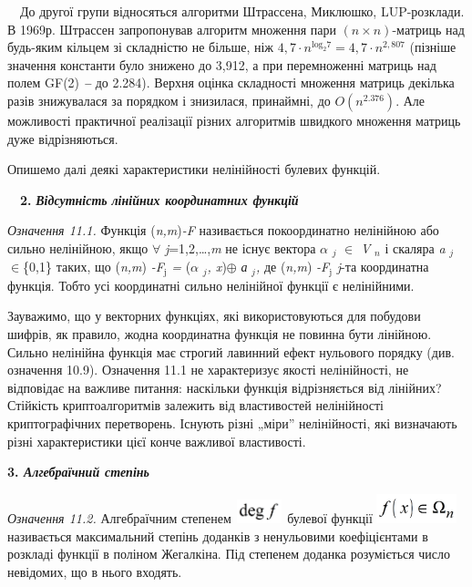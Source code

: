 \documentclass[a4paper]{article}
\newcommand\textsubscript[1]{\ensuremath{{}_{\text{#1}}}}
\newcounter{}
\begin{document}
\ \ До другої групи відносяться алгоритми Штрассена, Миклюшко, LUP-розклади. В
1969р. Штрассен запропонував алгоритм множення пари  ${(n\times n)}${}-матриць
над будь-яким кільцем зі складністю не більше, ніж  ${4,7\cdot
n^{{\text{log}_{{2}}7}}=4,7\cdot n^{2,\text{807}}}$ (пізніше значення константи
було знижено до 3,912, а при перемноженні матриць над полем
GF(2)\textbf{\textit{ – }}до  2.284). Верхня оцінка складності множення матриць
декілька разів знижувалася за порядком і  знизилася, принаймні, до 
${O(n^{{2\text{.}\text{376}}})}$. Але можливості практичної реалізації  різних
алгоритмів швидкого множення матриць дуже відрізняються. 

Опишемо далі деякі характеристики нелінійності булевих функцій.


\bigskip

\ \ \textbf{2. }\textbf{\textit{Відсутність}}\textbf{  }\textbf{\textit{лінійних
координатних функцій}}

 \textit{Означення 11.1.}\textit{ } Функція (\textit{n,m})\textit{{}-}\textit{F}
 називається покоординатно нелінійною або сильно нелінійною, якщо ${\forall}$
\textit{j}=1,2,…,\textit{m }не існує вектора ${\alpha}$ ${{}_{{j}}}$ ${\in}$
\textit{V} ${{}_{{n}}}$ і скаляра \textit{a} ${{}_{{j}}}$${\in}$\{0,1\} таких,
що (\textit{n,m})\textit{ -F{\textbar}}\textit{\textsubscript{j}}\textit{ =}
(\textit{${\alpha}$} ${{}_{{j}}}$\textit{, x})${\oplus}$\textit{ }\textit{а}
${{}_{{j}}}$\textit{, }де (\textit{n,m})\textit{
-F{\textbar}}\textit{\textsubscript{j}} \textit{ }\textit{j}{}-та координатна
функція. Тобто усі координатні сильно нелінійної функції є нелінійними.

Зауважимо, що у векторних функціях, які використовуються для побудови шифрів, як
правило, жодна координатна функція не повинна бути лінійною. Сильно нелінійна
функція має строгий лавинний ефект нульового порядку (див. означення 10.9).
Означення 11.1 не характеризує якості нелінійності, не відповідає на важливе
питання:  наскільки функція відрізняється від лінійних? Стійкість
криптоалгоритмів залежить від властивостей нелінійності  криптографічних
перетворень.  Існують різні „міри” нелінійності, які визначають різні
характеристики цієї конче важливої властивості. 


\bigskip


\bigskip

{\bfseries
3.\textit{ Алгебраїчний степінь}}

 \textit{Означення 11.2.}\textit{ }Алгебраїчним степенем 
\includegraphics[width=0.5425in,height=0.2665in]{crypt-img/crypt-img256.png} 
булевої функції 
\includegraphics[width=0.9098in,height=0.3354in]{crypt-img/crypt-img257.png} 
називається максимальний степінь доданків з ненульовими коефіцієнтами в
розкладі функції в поліном Жегалкіна. Під степенем доданка розуміється число
невідомих, що в нього входять. 
\end{document}
